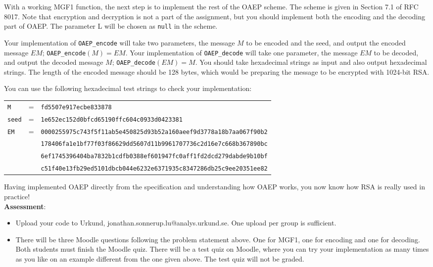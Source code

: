 \documentclass{article}
\begin{document}
\begin{description}
{				With a working MGF1 function, the next step is to implement the rest of the OAEP scheme. The scheme is given in Section 7.1 of RFC 8017. Note that encryption and decryption is not a part of the assignment, but you should implement both the encoding and the decoding part of OAEP. The parameter L will be chosen as \texttt{null} in the scheme.
				
				Your implementation of \texttt{OAEP\_encode} will take two parameters, the message $M$ to be encoded and the seed, and output the encoded message $EM$; \texttt{OAEP\_encode}$(M)=EM$.
				Your implementation of \texttt{OAEP\_decode} will take one parameter, the message $EM$ to be decoded, and output the decoded message $M$; \texttt{OAEP\_decode}$(EM)=M$. You should take hexadecimal strings as input and also output hexadecimal strings. The length of the encoded message should be 128 bytes, which would be preparing the message to be encrypted with 1024-bit RSA. 
				
				You can use the following hexadecimal test strings to check your implementation:
				\begin{center}
					\begin{tabular}{lcl}
						\texttt{M} & = & \texttt{fd5507e917ecbe833878}\\
						\texttt{seed} & = & \texttt{1e652ec152d0bfcd65190ffc604c0933d0423381}\\
						\texttt{EM} &=& \texttt{0000255975c743f5f11ab5e450825d93b52a160aeef9d3778a18b7aa067f90b2}\\                                 &&\texttt{178406fa1e1bf77f03f86629dd5607d11b9961707736c2d16e7c668b367890bc}\\
						&&\texttt{6ef1745396404ba7832b1cdfb0388ef601947fc0aff1fd2dcd279dabde9b10bf}\\
						&& \texttt{c51f40e13fb29ed5101dbcb044e6232e6371935c8347286db25c9ee20351ee82}\\
					\end{tabular}
				\end{center}
				
				Having implemented OAEP directly from the specification and understanding how OAEP works, you now know how RSA is really used in practice!\\
				\textbf{Assessment}:
				\begin{itemize}
					\item Upload your code to Urkund, jonathan.sonnerup.lu@analys.urkund.se.
					One upload per group is sufficient.
					\item There will be three Moodle questions following the problem statement above. One for MGF1, one for encoding and one for decoding. Both students must finish the Moodle quiz.
					There will be a test quiz on Moodle, where you can try your implementation as many times as you like on an example different from the one given above. The test quiz will not be graded.
				\end{itemize}
				
				
			}
		
		\end{description}
		
\end{document}
